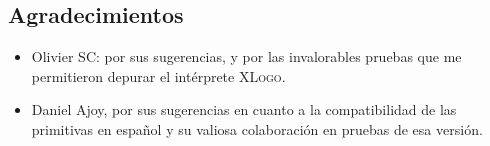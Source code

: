\subsection*{Agradecimientos}

\begin{itemize}
   \item Olivier SC: por sus sugerencias, y por las invalorables pruebas que
      me permitieron depurar el int\'erprete \textsc{XLogo}.
   \item Daniel Ajoy, por sus sugerencias en cuanto a la compatibilidad de
      las primitivas en espa\~nol y su valiosa colaboraci\'on en pruebas de
      esa versi\'on.
\end{itemize}